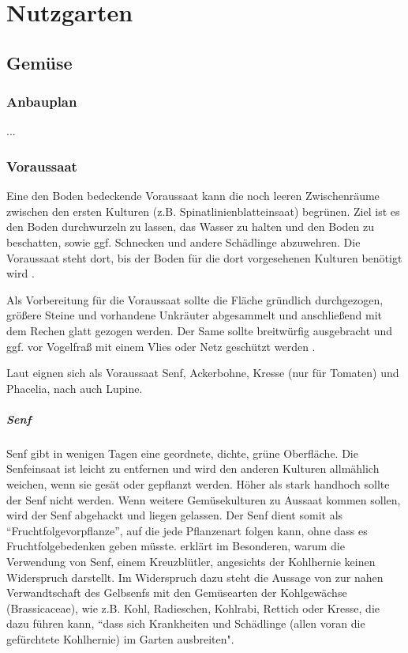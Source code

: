 \chapter{Nutzgarten}

\pagebreak

\section{Gemüse}

\subsection{Anbauplan}
...

\subsection{Voraussaat}
\label{Voraussaat}

Eine den Boden bedeckende Voraussaat kann die noch leeren Zwischenräume zwischen den ersten Kulturen (z.B. Spinatlinienblatteinsaat) begrünen.
Ziel ist es den Boden durchwurzeln zu lassen, das Wasser zu halten und den Boden zu beschatten, sowie ggf. Schnecken und andere Schädlinge abzuwehren.
Die Voraussaat steht dort, bis der Boden für die dort vorgesehenen Kulturen benötigt wird \citep[S.~37f]{Franck1981} \cite{Franck1981}.

Als Vorbereitung für die Voraussaat sollte die Fläche gründlich durchgezogen, größere Steine und vorhandene Unkräuter abgesammelt und anschließend mit dem Rechen glatt gezogen werden.
Der Same sollte breitwürfig ausgebracht und ggf. vor Vogelfraß mit einem Vlies oder Netz geschützt werden \citep[S.~11]{Heberer2018}.

Laut \citet[S.~37ff]{Franck1981} eignen sich als Voraussaat Senf, Ackerbohne, Kresse (nur für Tomaten) und Phacelia, nach \citet{Schwinn2025} \cite{Schwinn2025} auch Lupine.

\paragraph{Senf}
Senf gibt in wenigen Tagen eine geordnete, dichte, grüne Oberfläche.
Die Senfeinsaat ist leicht zu entfernen und wird den anderen Kulturen allmählich weichen, wenn sie gesät oder gepflanzt werden.
Höher als stark handhoch sollte der Senf nicht werden.
Wenn weitere Gemüsekulturen zu Aussaat kommen sollen, wird der Senf abgehackt und liegen gelassen.
Der Senf dient somit als ``Fruchtfolgevorpflanze'', auf die jede Pflanzenart folgen kann, ohne dass es Fruchtfolgebedenken geben müsste.
\citet[S.~38]{Franck1981} erklärt im Besonderen, warum die Verwendung von Senf, einem Kreuzblütler, angesichts der Kohlhernie keinen Widerspruch darstellt.
Im Widerspruch dazu steht die Aussage von \citet[S.~115]{Heberer2018} zur nahen Verwandtschaft des Gelbsenfs mit den Gemüsearten der Kohlgewächse (Brassicaceae), wie z.B. Kohl, Radieschen, Kohlrabi, Rettich oder Kresse, die dazu führen kann, ``dass sich Krankheiten und Schädlinge (allen voran die gefürchtete Kohlhernie) im Garten ausbreiten".

